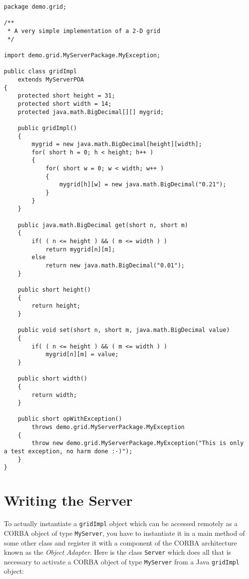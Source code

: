 \documentclass[12pt]{scrbook}
\begin{document}
\small{
\begin{verbatim}
package demo.grid;

/**
 * A very simple implementation of a 2-D grid
 */

import demo.grid.MyServerPackage.MyException;

public class gridImpl
    extends MyServerPOA
{
    protected short height = 31;
    protected short width = 14;
    protected java.math.BigDecimal[][] mygrid;

    public gridImpl()
    {
        mygrid = new java.math.BigDecimal[height][width];
        for( short h = 0; h < height; h++ )
        {
            for( short w = 0; w < width; w++ )
            {
                mygrid[h][w] = new java.math.BigDecimal("0.21");
            }
        }
    }

    public java.math.BigDecimal get(short n, short m)
    {
        if( ( n <= height ) && ( m <= width ) )
            return mygrid[n][m];
        else
            return new java.math.BigDecimal("0.01");
    }

    public short height()
    {
        return height;
    }

    public void set(short n, short m, java.math.BigDecimal value)
    {
        if( ( n <= height ) && ( m <= width ) )
            mygrid[n][m] = value;
    }

    public short width()
    {
        return width;
    }

    public short opWithException()
        throws demo.grid.MyServerPackage.MyException
    {
        throw new demo.grid.MyServerPackage.MyException("This is only a test exception, no harm done :-)");
    }
}
\end{verbatim}
}

\section{Writing the Server}

To actually instantiate a {\tt  gridImpl} object which can be accessed
remotely  as  a CORBA  object  of type  {\tt  MyServer},  you have  to
instantiate it  in a main method  of some other class  and register it
with a  component of the CORBA  architecture known as  the {\it Object
Adapter}. Here is  the class {\tt Server} which  does all that is
necessary to  activate a  CORBA object of  type {\tt MyServer}  from a
Java {\tt gridImpl} object:
\end{document}

